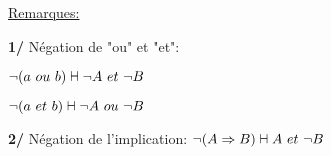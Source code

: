 \documentclass[12pt,twoside,a4paper]{article}
\newcommand{\vdashv}{\mathrel{\text{\ooalign{$\vdash$\cr$\dashv$\cr}}}}
\begin{document}
		\underline{Remarques:}
		\begin{liste}
			\item[\textbf{1/}] N\'egation de "ou" et "et":
				\begin{liste}
					\item $\neg (a\ ou\ b)\vdashv \neg A\ et\ \neg B$
					\item $\neg(a\ et\ b)\vdashv \neg A \ ou\ \neg B$
				\end{liste}
			\item[\textbf{2/}] N\'egation de l'implication:
				$\neg(A\Rightarrow B)\vdashv A\ et\ \neg B$
		\end{liste}
\end{document}
